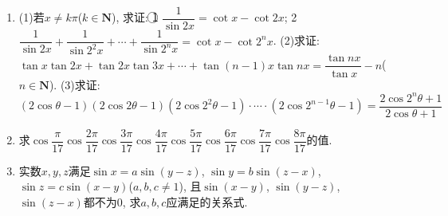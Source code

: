 \documentclass[10pt,a4paper]{article}
\newcommand{\blank}[1]{\underline{\hbox to #1pt{}}}
\begin{document}
\begin{enumerate}[1.]
(2)如图, 已知扇形$AOB$的中心角为45°, 半径为1, 矩形$MNPQ$内接于扇形, 使$P,Q$点在半径$OA$上, 求矩形$MNPQ$的对角线$PM$的最小值.
(3)如图, 已知$P$是正方形$ABCD$内一点, $PQ\perp BC$, $PR\perp CD$, ($Q,R$为垂足), $AB=10$, $AP=9$, 求矩形面积的最大值、最小值.
\blank{50}(第177(2)题)\blank{50}(第177(3)题)
\item (1)若$x\ne k\pi$($k\in \mathbf{N}$), 求证:
\textcircled{1} $\dfrac 1{\sin 2x}=\cot x-\cot 2x$;
\textcircled{2} $\dfrac 1{\sin 2x}+\dfrac 1{\sin 2^2x}+\cdots +\dfrac 1{\sin 2^nx}=\cot x-\cot 2^nx$.
(2)求证: $\tan x\tan 2x+\tan 2x\tan 3x+\cdots +\tan (n-1)x\tan nx=\dfrac{\tan nx}{\tan x}-n$($n\in \mathbf{N}$).
(3)求证: $(2\cos \theta -1)(2\cos 2\theta -1)(2\cos 2^2\theta -1)\cdot \cdots \cdot (2\cos 2^{n-1}\theta -1)=\dfrac{2\cos 2^n\theta +1}{2\cos \theta +1}$
\item 求$\cos \dfrac{\pi }{17}\cos \dfrac{2\pi }{17}\cos \dfrac{3\pi }{17}\cos \dfrac{4\pi }{17}\cos \dfrac{5\pi }{17}\cos \dfrac{6\pi }{17}\cos \dfrac{7\pi }{17}\cos \dfrac{8\pi }{17}$的值.
\item 实数$x,y,z$满足$\sin x=a\sin (y-z)$, $\sin y=b\sin (z-x)$, $\sin z=c\sin (x-y)$($a,b,c\ne 1$), 且$\sin (x-y)$, $\sin (y-z)$, $\sin (z-x)$都不为0, 求$a,b,c$应满足的关系式.
    
    
\end{enumerate}
\end{document}

